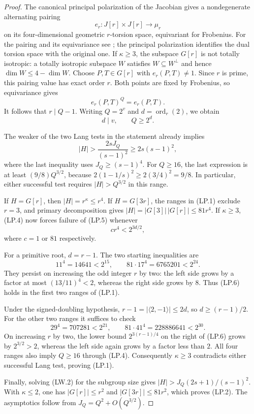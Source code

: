 \begin{proof}
The canonical principal polarization of the Jacobian gives a
nondegenerate alternating pairing
\[
                e_r:J[r]\times J[r]\longrightarrow\mu_r
\tag{LP.3}
\]
on its four-dimensional geometric $r$-torsion space, equivariant
for Frobenius.  For the pairing and its equivariance see
\cite[\S16, p.~29, and Lemma~16.2(e), p.~30]{MilneAV};
the principal polarization identifies the dual torsion space
with the original one.
If $\kappa\ge3$, the subspace $G[r]$ is not totally isotropic:
a totally isotropic subspace $W$ satisfies
$W\subseteq W^\perp$ and hence
$\dim W\le4-\dim W$.
Choose $P,T\in G[r]$ with $e_r(P,T)\ne1$.
Since $r$ is prime, this pairing value has exact order $r$.
Both points are fixed by Frobenius, so equivariance gives
\[
                         e_r(P,T)^Q=e_r(P,T).
\]
It follows that $r\mid Q-1$.
Writing $Q=2^v$ and $d=\operatorname{ord}_r(2)$, we obtain
\[
                         d\mid v,\qquad Q\ge2^d.
\tag{LP.4}
\]

The weaker of the two Lang tests in the statement already
implies
\[
 |H|>\frac{2sJ_Q}{(s-1)^2}
       \ge 2s(s-1)^2,
\tag{LP.5}
\]
where the last inequality uses $J_Q\ge(s-1)^4$.
For $Q\ge16$, the last expression is at least
$(9/8)Q^{3/2}$, because
$2(1-1/s)^2\ge2(3/4)^2=9/8$.
In particular, either successful test requires
$|H|>Q^{3/2}$ in this range.

If $H=G[r]$, then $|H|=r^\kappa\le r^4$.
If $H=G[3r]$, the ranges in (LP.1) exclude $r=3$, and
primary decomposition gives
$|H|=|G[3]|\,|G[r]|\le81r^4$.
If $\kappa\ge3$, (LP.4) now forces failure of (LP.5)
whenever
\[
                         c r^4<2^{3d/2},
\tag{LP.6}
\]
where $c=1$ or $81$ respectively.

For a primitive root, $d=r-1$.
The two starting inequalities are
\[
 11^4=14641<2^{15},\qquad
 81\cdot17^4=6765201<2^{24}.
\]
They persist on increasing the odd integer $r$ by two:
the left side grows by a factor at most
$(13/11)^4<2$, whereas the right side grows by $8$.
Thus (LP.6) holds in the first two ranges of (LP.1).

Under the signed-doubling hypothesis,
$r-1=|\langle2,-1\rangle|\le2d$, so
$d\ge(r-1)/2$.
For the other two ranges it suffices to check
\[
 29^4=707281<2^{21},\qquad
 81\cdot41^4=228886641<2^{30}.
\]
On increasing $r$ by two, the lower bound
$2^{3(r-1)/4}$ on the right of (LP.6) grows by
$2^{3/2}>2$, whereas the left side again grows by a
factor less than $2$.
All four ranges also imply $Q\ge16$ through (LP.4).
Consequently $\kappa\ge3$ contradicts either successful
Lang test, proving (LP.1).

Finally, solving (LW.2) for the subgroup size gives
$|H|>J_Q(2s+1)/(s-1)^2$.
With $\kappa\le2$, one has $|G[r]|\le r^2$ and
$|G[3r]|\le81r^2$, which proves (LP.2).
The asymptotics follow from $J_Q=Q^2+O(Q^{3/2})$.
\end{proof}


